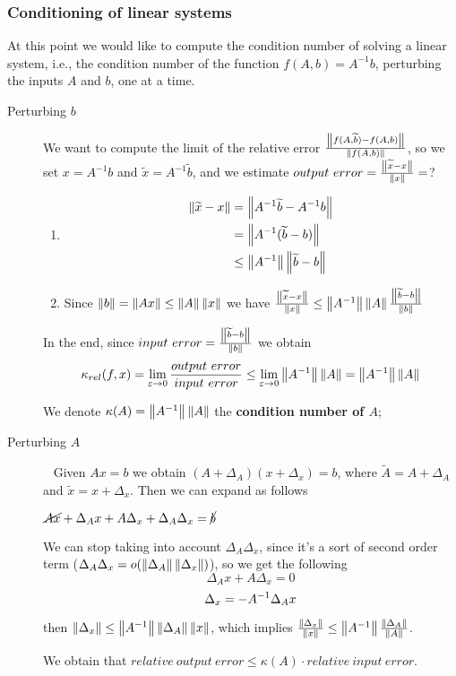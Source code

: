 \documentclass[computational_mathematics.tex]{subfiles}
\begin{document}
\subsubsection{Conditioning of linear systems}
At this point we would like to compute the condition number of solving a linear system, i.e., the condition number of the function $f(A,b)=A^{-1}b$, perturbing the inputs $A$ and $b$, one at a time.

\begin{description}
  \item[{\sc Perturbing} $b$] We want to compute the limit of the relative error $\frac{\left\lVert f(A, \widetilde{b}) - f(A, b)\right\rVert}{\left\lVert f(A, b)\right\rVert}$, so we set $x=A^{-1}b$ and $\tilde{x}=A^{-1}\tilde{b}$, and we estimate $output ~ error = \frac{\left\lVert\widetilde{x}-x\right\rVert}{\left\lVert x\right\rVert} =$?
    \begin{enumerate}
        \item \begin{equation}
          \begin{aligned}
            \left\lVert\widetilde{x} - x\right\rVert &= \left\lVert{A}^{-1} \widetilde{b} - {A}^{-1} b\right\rVert\\
            &= \left\lVert{A}^{-1} (\widetilde{b} - b)\right\rVert\\
            &\le \left\lVert{A}^{-1}\right\rVert \left\lVert\widetilde{b} - b\right\rVert\\
          \end{aligned}
          \end{equation}
        \item Since $\left\lVert b\right\rVert = \left\lVert Ax\right\rVert \le \left\lVert A\right\rVert \left\lVert x\right\rVert$ we have
          $\frac{\left\lVert\widetilde{x} - x\right\rVert}{\left\lVert x\right\rVert} \le \left\lVert{A}^{-1}\right\rVert \left\lVert A\right\rVert \frac{\left\lVert\widetilde{b} - b\right\rVert}{\left\lVert b\right\rVert}$
    \end{enumerate}
    In the end, since $input ~ error = \frac{\left\lVert\widetilde{b} - b\right\rVert}{\left\lVert b\right\rVert}$ we obtain 
    \[
      \kappa_{rel} (f, x) = \lim\limits_{\varepsilon \rightarrow 0} \frac{output ~ error}{input ~ error} \le \lim\limits_{\varepsilon \rightarrow 0} \left\lVert{A}^{-1}\right\rVert \left\lVert A\right\rVert = \left\lVert{A}^{-1}\right\rVert \left\lVert A\right\rVert
    \]
    
    We denote $\kappa(A) = \left\lVert{A}^{-1}\right\rVert \left\lVert A\right\rVert$ the \textbf{condition number of $A$};

  \item[{\sc Perturbing} $A$]~%
    Given $Ax=b$ we obtain $(A+\Delta_A) (x + \Delta_x)= b$, where $\widetilde{A} = A + \Delta_A$ and $\widetilde{x} = x + \Delta_x$. Then we can expand as follows

    $\cancel{Ax} + \Delta_A x + A \Delta_x + \Delta_A \Delta_x = \cancel{b}$

We can stop taking into account $\Delta_A \Delta_x$, since it's a sort of second order term ($ \Delta_A \Delta_x = o (\left\lVert\Delta_A\right\rVert \left\lVert\Delta_x\right\rVert)$), so we get the following
  \[
      \Delta_A x + A \Delta_x = 0
  \]
  \[
      \Delta_x = -{A}^{-1} \Delta_A x
    \]

then $\left\lVert\Delta_x\right\rVert \le \left\lVert{A}^{-1}\right\rVert \left\lVert\Delta_A\right\rVert \left\lVert x\right\rVert$, which implies $\frac{\left\lVert\Delta_x\right\rVert}{\left\lVert x\right\rVert} \le \left\lVert{A}^{-1}\right\rVert \frac{\left\lVert\Delta_A\right\rVert}{\left\lVert A\right\rVert}$.

We obtain that $relative ~ output ~ error \le \kappa(A) \cdot relative ~ input ~ error$.
\end{description}
\end{document}
